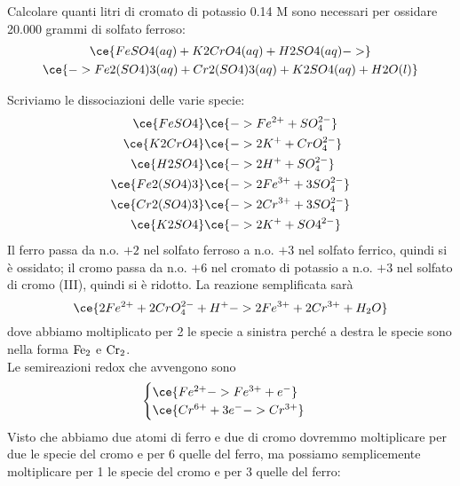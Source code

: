 \newpage

\begin{esercizio}
    Calcolare quanti litri di cromato di potassio 0.14 M sono necessari per ossidare 20.000 grammi di solfato ferroso:
    \begin{gather*}
        \ce{FeSO4(aq) + K2CrO4(aq) + H2SO4(aq) ->}
        \\
        \ce{-> Fe2(SO4)3(aq) + Cr2(SO4)3(aq) + K2SO4(aq) + H2O(l)}
    \end{gather*}
\end{esercizio}
\begin{soluzione}
    Scriviamo le dissociazioni delle varie specie:
    \begin{equation*}
        \begin{split}
            \ce{FeSO4} & \ce{-> Fe^{2+} + SO_4^{2-}}
            \\
            \ce{K2CrO4} & \ce{-> 2K^+ + CrO_4^{2-}}
            \\
            \ce{H2SO4} & \ce{-> 2H^+ + SO_4^{2-}}
            \\
            \ce{Fe2(SO4)3} & \ce{-> 2Fe^{3+} + 3SO_4^{2-}}
            \\
            \ce{Cr2(SO4)3} & \ce{-> 2Cr^{3+} + 3SO_4^{2-}}
            \\
            \ce{K2SO4} & \ce{-> 2K^+ + SO4^{2-}}
        \end{split}
    \end{equation*}
    Il ferro passa da n.o. $+2$ nel solfato ferroso a n.o. $+3$ nel solfato ferrico, quindi si è ossidato; il cromo passa da n.o. $+6$ nel cromato di potassio a n.o. $+3$ nel solfato di cromo (III), quindi si è ridotto. La reazione semplificata sarà
    \begin{equation*}
        \ce{2Fe^{2+} + 2CrO_4^{2-} + H^+ -> 2Fe^{3+} + 2Cr^{3+} + H_2O}
    \end{equation*}
    dove abbiamo moltiplicato per 2 le specie a sinistra perché a destra le specie sono nella forma $\rm Fe_2$ e $\rm Cr_2$.\\
    Le semireazioni redox che avvengono sono
    \begin{equation*}
        \begin{cases}
            \ce{Fe^{2+} -> Fe^{3+} + e^-}\\
            \ce{Cr^{6+} + 3e^- -> Cr^{3+}}
        \end{cases}
    \end{equation*}
    Visto che abbiamo due atomi di ferro e due di cromo dovremmo moltiplicare per due le specie del cromo e per 6 quelle del ferro, ma possiamo semplicemente moltiplicare per 1 le specie del cromo e per 3 quelle del ferro:

\end{soluzione}
